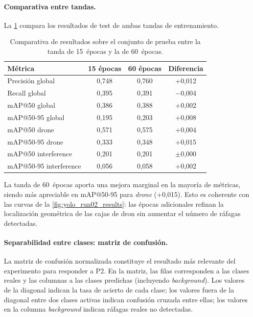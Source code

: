 \paragraph{Comparativa entre tandas.}

La \cref{tab:comparativa_epochs} compara los resultados de test de ambas tandas de entrenamiento.

\begin{table}[htbp]
\centering
\caption{Comparativa de resultados sobre el conjunto de prueba entre la tanda de \num{15}~épocas y la de \num{60}~épocas.}
\label{tab:comparativa_epochs}
\begin{tabular}{lccc}
\toprule
\textbf{Métrica} & \textbf{15 épocas} & \textbf{60 épocas} & \textbf{Diferencia} \\
\midrule
Precisión global        & 0,748 & 0,760 & +0,012 \\
Recall global           & 0,395 & 0,391 & $-$0,004 \\
mAP@50 global           & 0,386 & 0,388 & +0,002 \\
mAP@50-95 global        & 0,195 & 0,203 & +0,008 \\
mAP@50 drone            & 0,571 & 0,575 & +0,004 \\
mAP@50-95 drone         & 0,333 & 0,348 & +0,015 \\
mAP@50 interference     & 0,201 & 0,201 & $\pm$0,000 \\
mAP@50-95 interference  & 0,056 & 0,058 & +0,002 \\
\bottomrule
\end{tabular}
\end{table}

La tanda de \num{60}~épocas aporta una mejora marginal en la mayoría de métricas, siendo más apreciable en mAP@50-95 para \emph{drone} (+0,015). Esto es coherente con las curvas de la \cref{fig:yolo_run02_results}: las épocas adicionales refinan la localización geométrica de las cajas de dron sin aumentar el número de ráfagas detectadas.

\FloatBarrier
\paragraph{Separabilidad entre clases: matriz de confusión.}

La matriz de confusión normalizada constituye el resultado más relevante del experimento para responder a P2. En la matriz, las filas corresponden a las clases reales y las columnas a las clases predichas (incluyendo \emph{background}). Los valores de la diagonal indican la tasa de acierto de cada clase; los valores fuera de la diagonal entre dos clases activas indican confusión cruzada entre ellas; los valores en la columna \emph{background} indican ráfagas reales no detectadas.

